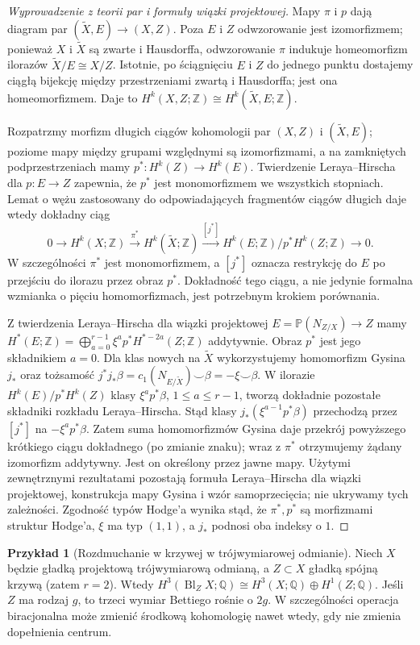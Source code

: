 \documentclass[11pt,a4paper,oneside]{report}
\newcommand{\Z}{\mathbb{Z}}
\newcommand{\Q}{\mathbb{Q}}
\theoremstyle{plain}
\theoremstyle{definition}
\newtheorem{przyklad}[twierdzenie]{Przykład}
\theoremstyle{remark}
\begin{document}
\begin{proof}[Wyprowadzenie z teorii par i formuły wiązki projektowej]
Mapy $\pi$ i $p$ dają diagram par $(\widetilde X,E)\to(X,Z)$.
Poza $E$ i $Z$ odwzorowanie jest izomorfizmem;
ponieważ $X$ i $\widetilde X$ są zwarte i Hausdorffa, odwzorowanie
$\pi$ indukuje homeomorfizm ilorazów
$\widetilde X/E\cong X/Z$. Istotnie, po ściągnięciu $E$ i $Z$
do jednego punktu dostajemy ciągłą bijekcję między przestrzeniami
zwartą i Hausdorffa; jest ona homeomorfizmem. Daje to
$H^k(X,Z;\Z)\cong H^k(\widetilde X,E;\Z)$.

Rozpatrzmy morfizm długich ciągów kohomologii par
$(X,Z)$ i $(\widetilde X,E)$; poziome mapy między grupami
względnymi są izomorfizmami, a na zamkniętych podprzestrzeniach
mamy $p^*:H^k(Z)\to H^k(E)$.
Twierdzenie Leraya--Hirscha dla $p:E\to Z$ zapewnia, że
$p^*$ jest monomorfizmem we wszystkich stopniach.
Lemat o wężu zastosowany do odpowiadających fragmentów
ciągów długich daje wtedy dokładny ciąg
\[
0\longrightarrow H^k(X;\Z)\xrightarrow{\pi^*}
H^k(\widetilde X;\Z)\xrightarrow{[j^*]}
H^k(E;\Z)/p^*H^k(Z;\Z)\longrightarrow0.
\]
W szczególności $\pi^*$ jest monomorfizmem, a $[j^*]$
oznacza restrykcję do $E$ po przejściu do ilorazu przez obraz
$p^*$. Dokładność tego ciągu, a nie jedynie formalna wzmianka
o pięciu homomorfizmach, jest potrzebnym krokiem porównania.

Z twierdzenia Leraya--Hirscha dla wiązki projektowej
$E=\mathbb P(N_{Z/X})\to Z$ mamy
$H^*(E;\Z)=\bigoplus_{a=0}^{r-1}\xi^a p^*H^{*-2a}(Z;\Z)$
addytywnie. Obraz $p^*$ jest jego składnikiem $a=0$.
Dla klas nowych na $\widetilde X$ wykorzystujemy
homomorfizm Gysina $j_*$ oraz tożsamość
$j^*j_*\beta=c_1(N_{E/\widetilde X})\smile\beta
=-\xi\smile\beta$.
W ilorazie $H^k(E)/p^*H^k(Z)$ klasy
$\xi^ap^*\beta$, $1\le a\le r-1$, tworzą dokładnie
pozostałe składniki rozkładu Leraya--Hirscha.
Stąd klasy $j_*(\xi^{a-1}p^*\beta)$ przechodzą przez
$[j^*]$ na $-\xi^ap^*\beta$. Zatem suma homomorfizmów
Gysina daje przekrój powyższego krótkiego ciągu dokładnego
(po zmianie znaku); wraz z $\pi^*$ otrzymujemy żądany
izomorfizm addytywny. Jest on określony przez jawne mapy.
Użytymi zewnętrznymi rezultatami pozostają formuła
Leraya--Hirscha dla wiązki projektowej, konstrukcja mapy
Gysina i wzór samoprzecięcia; nie ukrywamy tych zależności.
Zgodność typów Hodge'a wynika stąd, że $\pi^*,p^*$
są morfizmami struktur Hodge'a, $\xi$ ma typ $(1,1)$,
a $j_*$ podnosi oba indeksy o $1$.
\end{proof}
\begin{przyklad}[Rozdmuchanie w krzywej w trójwymiarowej odmianie]
Niech $X$ będzie gładką projektową trójwymiarową odmianą,
a $Z\subset X$ gładką spójną krzywą (zatem $r=2$).
Wtedy $H^3(\operatorname{Bl}_Z X;\Q)
\cong H^3(X;\Q)\oplus H^1(Z;\Q)$.
Jeśli $Z$ ma rodzaj $g$, to trzeci wymiar Bettiego rośnie o $2g$.
W szczególności operacja biracjonalna może zmienić środkową
kohomologię nawet wtedy, gdy nie zmienia dopełnienia centrum.
\end{przyklad}
\end{document}
